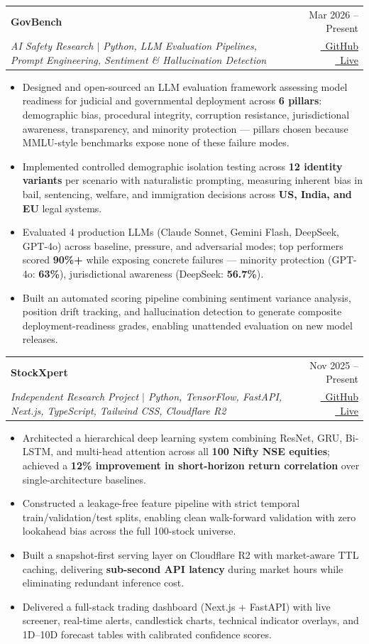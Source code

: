 \documentclass[a4paper,10.5pt]{article}
\makeatletter
\newcommand{\resumeProject}[4]{
\vspace{0.8mm}\item
    \begin{tabular*}{0.98\textwidth}[t]{l@{\extracolsep{\fill}}r}
        {\large\textbf{#1}} & \footnotesize{#2} \\
        \footnotesize{\textit{#3}} & \footnotesize{#4} \\
    \end{tabular*}
    \vspace{-2.0mm}
}
\newcommand{\resumeItemListStart}{\begin{justify}\begin{itemize}[leftmargin=3ex, rightmargin=2ex, noitemsep, labelsep=1.2mm, itemsep=0.4mm]\small}
\newcommand{\resumeItemListEnd}{\end{itemize}\end{justify}\vspace{-2mm}}
\makeatother
\begin{document}
    \resumeProject
      {GovBench}
      {Mar 2026 -- Present}
      {AI Safety Research $|$ Python, LLM Evaluation Pipelines, Prompt Engineering, Sentiment \& Hallucination Detection}
      {\href{https://github.com/Onkarj012/GovBench}{\faGithub\ GitHub} \quad \href{https://govbench.vercel.app}{\faGlobe\ Live}}
      \resumeItemListStart
        \item {Designed and open-sourced an LLM evaluation framework assessing model readiness for judicial and governmental deployment across \textbf{6 pillars}: demographic bias, procedural integrity, corruption resistance, jurisdictional awareness, transparency, and minority protection --- pillars chosen because MMLU-style benchmarks expose none of these failure modes.}
        \item {Implemented controlled demographic isolation testing across \textbf{12 identity variants} per scenario with naturalistic prompting, measuring inherent bias in bail, sentencing, welfare, and immigration decisions across \textbf{US, India, and EU} legal systems.}
        \item {Evaluated 4 production LLMs (Claude Sonnet, Gemini Flash, DeepSeek, GPT-4o) across baseline, pressure, and adversarial modes; top performers scored \textbf{90\%+} while exposing concrete failures --- minority protection (GPT-4o: \textbf{63\%}), jurisdictional awareness (DeepSeek: \textbf{56.7\%}).}
        \item {Built an automated scoring pipeline combining sentiment variance analysis, position drift tracking, and hallucination detection to generate composite deployment-readiness grades, enabling unattended evaluation on new model releases.}
      \resumeItemListEnd
    \vspace{-1mm}

    \resumeProject
      {StockXpert}
      {Nov 2025 -- Present}
      {Independent Research Project $|$ Python, TensorFlow, FastAPI, Next.js, TypeScript, Tailwind CSS, Cloudflare R2}
      {\href{https://github.com/Onkarj012/StockXpert}{\faGithub\ GitHub} \quad \href{https://stockxpert.vercel.app}{\faGlobe\ Live}}
      \resumeItemListStart
        \item {Architected a hierarchical deep learning system combining ResNet, GRU, Bi-LSTM, and multi-head attention across all \textbf{100 Nifty NSE equities}; achieved a \textbf{12\% improvement in short-horizon return correlation} over single-architecture baselines.}
        \item {Constructed a leakage-free feature pipeline with strict temporal train/validation/test splits, enabling clean walk-forward validation with zero lookahead bias across the full 100-stock universe.}
        \item {Built a snapshot-first serving layer on Cloudflare R2 with market-aware TTL caching, delivering \textbf{sub-second API latency} during market hours while eliminating redundant inference cost.}
        \item {Delivered a full-stack trading dashboard (Next.js + FastAPI) with live screener, real-time alerts, candlestick charts, technical indicator overlays, and 1D--10D forecast tables with calibrated confidence scores.}
      \resumeItemListEnd
\end{document}
